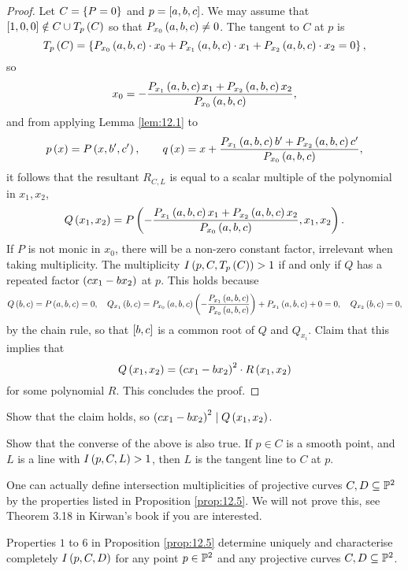\begin{proof}
Let $ C = \cb{P = 0} $ and $ p = \sb{a, b, c} $. We may assume that $ \sb{1, 0, 0} \notin C \cup T_p\rb{C} $ so that $ P_{x_0}\rb{a, b, c} \ne 0 $. The tangent to $ C $ at $ p $ is
$$ T_p\rb{C} = \cb{P_{x_0}\rb{a, b, c} \cdot x_0 + P_{x_1}\rb{a, b, c} \cdot x_1 + P_{x_2}\rb{a, b, c} \cdot x_2 = 0}, $$
so
$$ x_0 = -\dfrac{P_{x_1}\rb{a, b, c}x_1 + P_{x_2}\rb{a, b, c}x_2}{P_{x_0}\rb{a, b, c}}, $$
and from applying Lemma \ref{lem:12.1} to
$$ p\rb{x} = P\rb{x, b', c'}, \qquad q\rb{x} = x + \dfrac{P_{x_1}\rb{a, b, c}b' + P_{x_2}\rb{a, b, c}c'}{P_{x_0}\rb{a, b, c}}, $$
it follows that the resultant $ R_{C, L} $ is equal to a scalar multiple of the polynomial in $ x_1, x_2 $,
$$ Q\rb{x_1, x_2} = P\rb{-\dfrac{P_{x_1}\rb{a, b, c}x_1 + P_{x_2}\rb{a, b, c}x_2}{P_{x_0}\rb{a, b, c}}, x_1, x_2}. $$
If $ P $ is not monic in $ x_0 $, there will be a non-zero constant factor, irrelevant when taking multiplicity. The multiplicity $ I\rb{p, C, T_p\rb{C}} > 1 $ if and only if $ Q $ has a repeated factor $ \rb{cx_1 - bx_2} $ at $ p $. This holds because
$$ Q\rb{b, c} = P\rb{a, b, c} = 0, \quad Q_{x_1}\rb{b, c} = P_{x_0}\rb{a, b, c}\rb{-\dfrac{P_{x_1}\rb{a, b, c}}{P_{x_0}\rb{a, b, c}}} + P_{x_1}\rb{a, b, c} + 0 = 0, \quad Q_{x_2}\rb{b, c} = 0, $$
by the chain rule, so that $ \sb{b, c} $ is a common root of $ Q $ and $ Q_{x_i} $. Claim that this implies that
$$ Q\rb{x_1, x_2} = \rb{cx_1 - bx_2}^2 \cdot R\rb{x_1, x_2} $$
for some polynomial $ R $. This concludes the proof.
\end{proof}

\begin{exercise}
Show that the claim holds, so $ \rb{cx_1 - bx_2}^2 \mid Q\rb{x_1, x_2} $.
\end{exercise}

\begin{exercise}
Show that the converse of the above is also true. If $ p \in C $ is a smooth point, and $ L $ is a line with $ I\rb{p, C, L} > 1 $, then $ L $ is the tangent line to $ C $ at $ p $.
\end{exercise}

One can actually define intersection multiplicities of projective curves $ C, D \subseteq \P^2 $ by the properties listed in Proposition \ref{prop:12.5}. We will not prove this, see Theorem 3.18 in Kirwan's book if you are interested.

\begin{proposition}
\label{prop:12.8}
Properties $ 1 $ to $ 6 $ in Proposition \ref{prop:12.5} determine uniquely and characterise completely $ I\rb{p, C, D} $ for any point $ p \in \P^2 $ and any projective curves $ C, D \subseteq \P^2 $.
\end{proposition}

